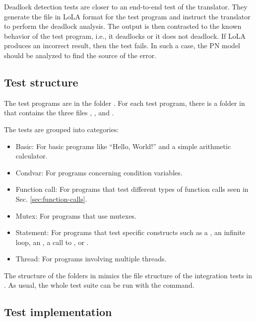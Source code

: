 Deadlock detection tests are closer to an end-to-end test of the translator.
They generate the file in \acrshort{LoLA} format for the test program
and instruct the translator to perform the deadlock analysis.
The output is then contrasted to the known behavior of the test program, i.e.,
it deadlocks or it does not deadlock.
If \acrshort{LoLA} produces an incorrect result, then the test fails.
In such a case, the \acrshort{PN} model should be analyzed
to find the source of the error.

\subsection{Test structure}

The test programs are in the folder .
For each test program, there is a folder in 
that contains the three files
, , and .

The tests are grouped into categories:

\begin{itemize}
  \item Basic: For basic programs like ``Hello, World!'' and a simple arithmetic calculator.
  \item Condvar: For programs concerning condition variables.
  \item Function call: For programs that test different types
        of function calls seen in Sec. \ref{sec:function-calls}.
  \item Mutex: For programs that use mutexes.
  \item Statement: For programs that test specific constructs such as a ,
        an infinite loop, an , a call to ,
        or .
  \item Thread: For programs involving multiple threads.
\end{itemize}

The structure of the folders in  mimics the file structure
of the integration tests in .
As usual, the whole test suite can be run with the  command.

\subsection{Test implementation}

